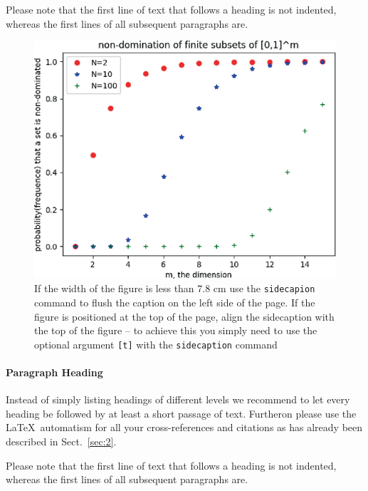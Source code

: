 Please note that the first line of text that follows a heading is not indented, whereas the first lines of all subsequent paragraphs are.

%
\begin{figure}[b]
    \sidecaption
    \includegraphics{figure}
    \caption{If the width of the figure is less than 7.8 cm use the \texttt{sidecapion} command to flush the caption on the left side of the page. If the figure is positioned at the top of the page, align the sidecaption with the top of the figure -- to achieve this you simply need to use the optional argument \texttt{[t]} with the \texttt{sidecaption} command}
    \label{fig:1}       %
\end{figure}


\paragraph{Paragraph Heading} %
Instead of simply listing headings of different levels we recommend to let every heading be followed by at least a short passage of text. Furtheron please use the \LaTeX\ automatism for all your cross-references and citations as has already been described in Sect.~\ref{sec:2}.

Please note that the first line of text that follows a heading is not indented, whereas the first lines of all subsequent paragraphs are.

